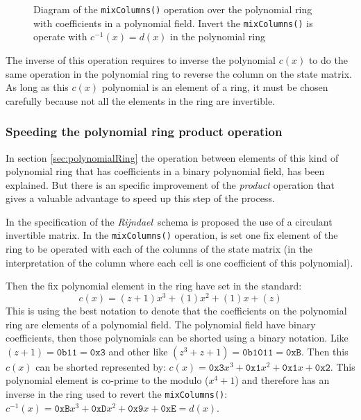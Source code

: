 \documentclass[10pt,a4paper,twoside]{llncs}
\newcommand{\rijndael}{\emph{Rijndael}}
\begin{document}

\begin{figure}[ht]
\begin{center}

\caption{Diagram of the {\tt mixColumns()} operation over the polynomial ring with coefficients in a polynomial field. Invert the {\tt mixColumns()} is operate with $c^{-1}(x)=d(x)$ in the polynomial ring}
\label{fig:mixColumns}
\end{center}
\end{figure}

The inverse of this operation requires to inverse the polynomial $c(x)$ to do the same operation in the polynomial ring to reverse the column on the state matrix. As long as this $c(x)$ polynomial is an element of a ring, it must be chosen carefully because not all the elements in the ring are invertible.

\subsubsection{Speeding the polynomial ring product operation}\label{sec:improvePolynomialRingProduct}
In section \ref{sec:polynomialRing} the operation between elements of this kind of polynomial ring that has coefficients in a binary polynomial field, has been explained. But there is an specific improvement of the \emph{product} operation that gives a valuable advantage to speed up this step of the process. 

In the specification of the \rijndael\, schema \cite{Daemen01aes-ammended} is proposed the use of a circulant invertible matrix. In the {\tt mixColumns()} operation, is set one fix element of the ring to be operated with each of the columns of the state matrix (in the interpretation of the column where each cell is one coefficient of this polynomial).

Then the fix polynomial element in the ring have set in the standard:
$$c(x) = (z+1)x^3+(1)x^2+(1)x+(z)$$
This is using the best notation to denote that the coefficients on the polynomial ring are elements of a polynomial field. The polynomial field have binary coefficients, then those polynomials can be shorted using a binary notation. Like $(z+1)=\texttt{0b11}=\texttt{0x3}$ and other like $(z^3+z+1)=\texttt{0b1011}=\texttt{0xB}$. Then this $c(x)$ can be shorted represented by: $c(x) = \texttt{0x3}x^3+\texttt{0x1}x^2+\texttt{0x1}x+\texttt{0x2}$. This polynomial element is co-prime to the modulo ($x^4+1$) and therefore has an inverse in the ring used to revert the {\tt mixColumns()}: $c^{-1}(x) = \texttt{0xB}x^3+\texttt{0xD}x^2+\texttt{0x9}x+\texttt{0xE}=d(x)$.
\end{document}
